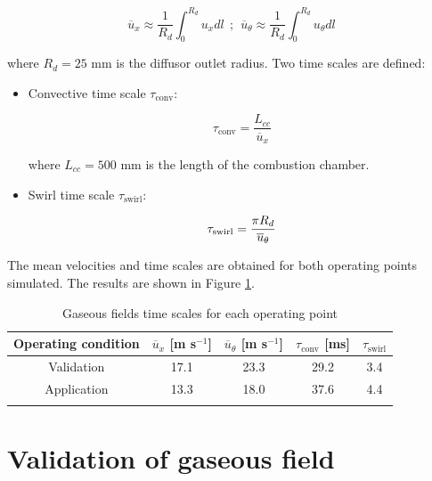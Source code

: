 \begin{equation}
\overline{u}_x \approx \frac{1}{R_d} \int_0^{R_d} u_x dl ~~ ; ~~ \overline{u}_\theta \approx \frac{1}{R_d} \int_0^{R_d} u_\theta dl
\end{equation}

where $R_d = 25$ mm is the diffusor outlet radius. Two time scales are defined: 

\begin{itemize}

	\item Convective time scale $\tau_\mathrm{conv}$:
	
	\begin{equation}
	\tau_\mathrm{conv} = \frac{L_{cc}}{\overline{u}_x} 
	\end{equation}
	
	where $L_{cc} = 500$ mm is the length of the combustion chamber.
	
	\item Swirl time scale $\tau_\mathrm{swirl}$:
	
	\begin{equation}
	\tau_\mathrm{swirl} = \frac{\pi R_d}{\overline{u}_{\scriptsize{\theta}}}
	\end{equation}	
	
\end{itemize}

The mean velocities and time scales are obtained for both operating points simulated. The results are shown in Figure \ref{tab:gaseous_field_timescales}.

\begin{table}[!h]
\centering
\caption{Gaseous fields time scales for each operating point}
\begin{tabular}{ccccc}
\thickhline
Operating condition    & $\overline{u}_x$ [m s$^{-1}$]   & $\overline{u}_\theta$ [m s$^{-1}$] & $\tau_\mathrm{conv}$  [ms] &  $\tau_\mathrm{swirl}$ \\
\hline
Validation & 17.1 & 23.3  & 29.2 & 3.4 \\
Application & 13.3 & 18.0 & 37.6 & 4.4 \\
\thickhline
\end{tabular}
\label{tab:gaseous_field_timescales}
\end{table}


\section{Validation of gaseous field}
\label{sec:ch7_BIMER_validation_point}

